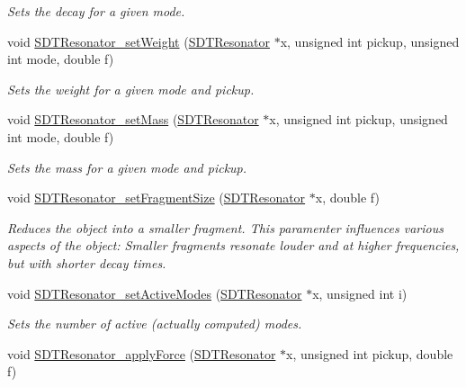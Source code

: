 \begin{DoxyCompactItemize}
\begin{DoxyCompactList}\small\item\em Sets the decay for a given mode. \end{DoxyCompactList}\item 
void \hyperlink{group__resonators_ga9213fe8d7e2c3bb97aadb8755dd8d067}{S\+D\+T\+Resonator\+\_\+set\+Weight} (\hyperlink{group__resonators_ga07d183de45e9713277c8f62d93d9be9c}{S\+D\+T\+Resonator} $\ast$x, unsigned int pickup, unsigned int mode, double f)
\begin{DoxyCompactList}\small\item\em Sets the weight for a given mode and pickup. \end{DoxyCompactList}\item 
void \hyperlink{group__resonators_ga4759c63641f563f80566fbfff25614af}{S\+D\+T\+Resonator\+\_\+set\+Mass} (\hyperlink{group__resonators_ga07d183de45e9713277c8f62d93d9be9c}{S\+D\+T\+Resonator} $\ast$x, unsigned int pickup, unsigned int mode, double f)
\begin{DoxyCompactList}\small\item\em Sets the mass for a given mode and pickup. \end{DoxyCompactList}\item 
void \hyperlink{group__resonators_gac5470752ba965676b14985d17d371f10}{S\+D\+T\+Resonator\+\_\+set\+Fragment\+Size} (\hyperlink{group__resonators_ga07d183de45e9713277c8f62d93d9be9c}{S\+D\+T\+Resonator} $\ast$x, double f)
\begin{DoxyCompactList}\small\item\em Reduces the object into a smaller fragment. This paramenter influences various aspects of the object\+: Smaller fragments resonate louder and at higher frequencies, but with shorter decay times. \end{DoxyCompactList}\item 
void \hyperlink{group__resonators_ga37a78caeccdbaefbc4b7f842b110b7ee}{S\+D\+T\+Resonator\+\_\+set\+Active\+Modes} (\hyperlink{group__resonators_ga07d183de45e9713277c8f62d93d9be9c}{S\+D\+T\+Resonator} $\ast$x, unsigned int i)
\begin{DoxyCompactList}\small\item\em Sets the number of active (actually computed) modes. \end{DoxyCompactList}\item 
void \hyperlink{group__resonators_ga9d63332360ee72a9bbcb1dcd85d877a5}{S\+D\+T\+Resonator\+\_\+apply\+Force} (\hyperlink{group__resonators_ga07d183de45e9713277c8f62d93d9be9c}{S\+D\+T\+Resonator} $\ast$x, unsigned int pickup, double f)

\end{DoxyCompactItemize}
